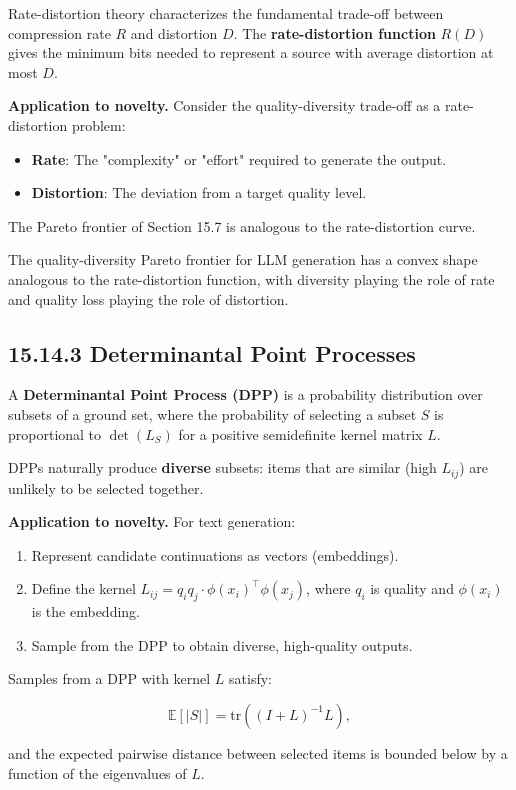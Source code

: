 Rate-distortion theory characterizes the fundamental trade-off between compression rate $R$ and distortion $D$. The \textbf{rate-distortion function} $R(D)$ gives the minimum bits needed to represent a source with average distortion at most $D$.

\textbf{Application to novelty.} Consider the quality-diversity trade-off as a rate-distortion problem:
\begin{itemize}
\item \textbf{Rate}: The "complexity" or "effort" required to generate the output.
\item \textbf{Distortion}: The deviation from a target quality level.
\end{itemize}

The Pareto frontier of Section 15.7 is analogous to the rate-distortion curve.

\begin{conjecture}
The quality-diversity Pareto frontier for LLM generation has a convex shape analogous to the rate-distortion function, with diversity playing the role of rate and quality loss playing the role of distortion.
\end{conjecture}

\subsection{15.14.3 Determinantal Point Processes}

A \textbf{Determinantal Point Process (DPP)} is a probability distribution over subsets of a ground set, where the probability of selecting a subset $S$ is proportional to $\det(L_S)$ for a positive semidefinite kernel matrix $L$.

DPPs naturally produce \textbf{diverse} subsets: items that are similar (high $L_{ij}$) are unlikely to be selected together.

\textbf{Application to novelty.} For text generation:
\begin{enumerate}
\item Represent candidate continuations as vectors (embeddings).
\item Define the kernel $L_{ij} = q_i q_j \cdot \phi(x_i)^\top \phi(x_j)$, where $q_i$ is quality and $\phi(x_i)$ is the embedding.
\item Sample from the DPP to obtain diverse, high-quality outputs.
\end{enumerate}

\begin{proposition}
Samples from a DPP with kernel $L$ satisfy:

\[\mathbb{E}[|S|] = \mathrm{tr}((I + L)^{-1} L),\]

and the expected pairwise distance between selected items is bounded below by a function of the eigenvalues of $L$.
\end{proposition}

